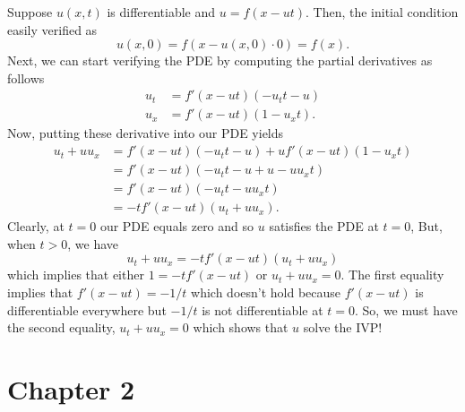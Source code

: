 \documentclass[a4paper,12pt]{article}
\begin{document}
    Suppose $ u(x,t) $ is differentiable and $ u = f(x - ut) $. Then, the initial condition easily verified as
    \[
    	u(x,0) = f(x - u(x,0) \cdot 0) = f(x).
    \]
    Next, we can start verifying the PDE by computing the partial derivatives as follows
    \begin{align*}
        u_t  &= f'(x - u t) (-u_t t - u) \\
        u_x &= f'(x - ut) (1 - u_x t).
    \end{align*}
    Now, putting these derivative into our PDE yields
    \begin{align*}
        u_t + u u_x &= f'(x - u t) (-u_t t - u) + u f'(x - ut) (1 - u_x t) \\
        &= f'(x - ut) (-u_t t - u + u - u u_x t) \\
        &= f'(x - ut) (-u_t t - u u_x t) \\
        &= -t f'(x - ut) (u_t + u u_x).
    \end{align*}
Clearly, at $ t = 0 $ our PDE equals zero and so $ u $ satisfies the PDE at $ t = 0 $, But, when $ t > 0 $, we have
\[
    u_t + u u_x = -t f'(x - ut) (u_t + u u_x)
\]
which implies that either $ 1 = -t f'(x - ut)  $ or $ u_t + u u_x = 0 $. The first equality implies that $ f'(x - ut) = -1/t $ which doesn't hold because $ f'(x - ut) $ is differentiable everywhere but $ - 1/t $ is not differentiable at $ t = 0 $. So, we must have the second equality, $ u_t + u u_x = 0 $ which shows that $ u $ solve the IVP!

\section*{Chapter 2}
\end{document}
